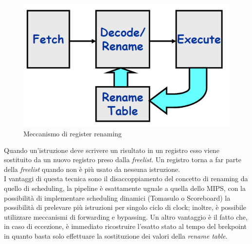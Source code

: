 \begin{figure}[htb]
\centering
\includegraphics[scale=0.5]{img/translation.png}
\caption{Meccanismo di register renaming}\label{fig:translation}
\end{figure}
Quando un'istruzione deve scrivere un risultato in un registro esso viene sostituito da un nuovo registro preso dalla \emph{freelist}. Un registro torna a far parte della \emph{freelist} quando non è più usato da nessuna istruzione.\\
I vantaggi di questa tecnica sono il disaccoppiamento del concetto di renaming da quello di scheduling, la pipeline è esattamente uguale a quella dello MIPS, con la possibilità di implementare scheduling dinamici (Tomasulo o Scoreboard) la possibilità di prelevare più istruzioni per singolo ciclo di clock; inoltre, è possibile utilizzare meccanismi di forwarding e bypassing. Un altro vantaggio è il fatto che, in caso di eccezione, è immediato ricostruire l'esatto stato al tempo del brekpoint in quanto basta solo effettuare la sostituzione dei valori della \emph{rename table}.
